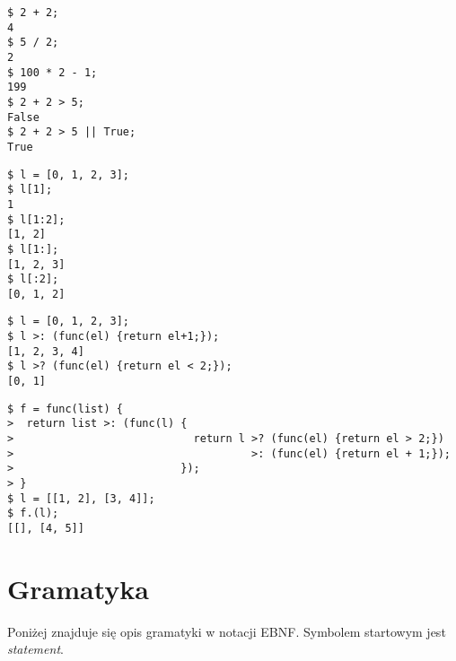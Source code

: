 \documentclass{article}
\begin{document}
\begin{lstlisting}[frame=tb, title={Operacje na typach prostych}]
$ 2 + 2;
4
$ 5 / 2;
2
$ 100 * 2 - 1;
199
$ 2 + 2 > 5;
False
$ 2 + 2 > 5 || True;
True
\end{lstlisting}
\begin{lstlisting}[frame=tb, title={Pobieranie elementów listy}]
$ l = [0, 1, 2, 3];
$ l[1];
1
$ l[1:2];
[1, 2]
$ l[1:];
[1, 2, 3]
$ l[:2];
[0, 1, 2]
\end{lstlisting}
\begin{lstlisting}[frame=tb, title={Operacje \textit{map} i \textit{filter}}]
$ l = [0, 1, 2, 3];
$ l >: (func(el) {return el+1;});
[1, 2, 3, 4]
$ l >? (func(el) {return el < 2;});
[0, 1]
\end{lstlisting}
\begin{lstlisting}[frame=tb, title={Obiekty funkcyjne}]
$ f = func(list) {
>  return list >: (func(l) {
>                            return l >? (func(el) {return el > 2;})
>                                     >: (func(el) {return el + 1;});
>                          });
> }
$ l = [[1, 2], [3, 4]];
$ f.(l);
[[], [4, 5]]
\end{lstlisting}

\section{Gramatyka}
	Poniżej znajduje się opis gramatyki w notacji EBNF. Symbolem startowym jest \textit{statement}.

	\renewcommand{\syntleft}{\normalfont\itshape}
	\renewcommand{\syntright}{}
\end{document}
